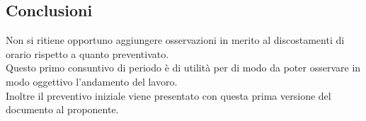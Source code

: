 	\subsection{Conclusioni}
	Non si ritiene opportuno aggiungere osservazioni in merito al discostamenti di orario rispetto a quanto preventivato.\\
	Questo primo consuntivo di periodo è di utilità per \gruppo di modo da poter osservare in modo oggettivo l'andamento del lavoro.\\
	Inoltre il preventivo iniziale viene presentato con questa prima versione del documento al proponente.
	